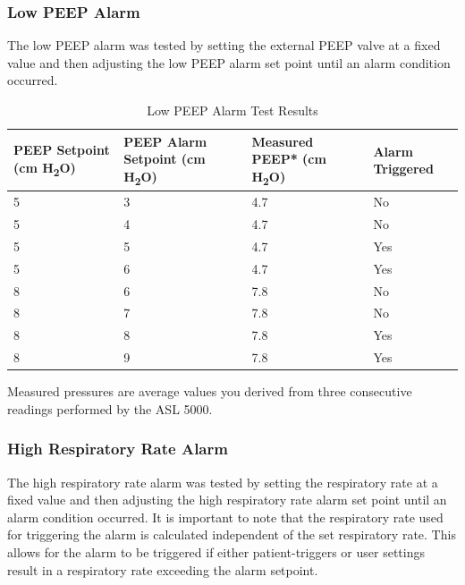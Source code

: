 \documentclass[]{article}
\begin{document}
\subsubsection{Low PEEP Alarm}

The low PEEP alarm was tested by setting the external PEEP valve at a fixed value and then adjusting the low PEEP alarm set point until an alarm condition occurred.

\begin{center}
	\begin{table}[h]
		\caption{Low PEEP Alarm Test Results}
		\label{tab:low_peep_test}
		\begin{tabular}{ |p{3.7cm}|p{3.3cm}|p{4cm}| p{2.9cm}|}
			
			\hline
			\textbf{PEEP Setpoint (cm H\textsubscript{2}O)} & \textbf{PEEP Alarm Setpoint (cm H\textsubscript{2}O)} & \textbf{Measured PEEP* (cm H\textsubscript{2}O)} & \textbf{Alarm Triggered}  \\ \hline
			5 & 3 & 4.7 & No\\ \hline
			5 & 4 & 4.7& No\\ \hline
			5 & 5 & 4.7 & Yes\\ \hline
			5 & 6 & 4.7 & Yes\\ \hline
			8 & 6 & 7.8 & No\\ \hline
			8 & 7 & 7.8 & No\\ \hline
			8 & 8 & 7.8 & Yes\\ \hline
			8 & 9 & 7.8 & Yes\\ \hline
		\end{tabular}
		\noindent *Measured pressures are average values you derived from three consecutive readings performed by the ASL 5000.
	\end{table}	
\end{center}

\subsubsection{High Respiratory Rate Alarm}
The high respiratory rate alarm was tested by setting the respiratory rate at a fixed value and then adjusting the high respiratory rate alarm set point until an alarm condition occurred.  It is important to note that the respiratory rate used for triggering the alarm is calculated independent of the set respiratory rate.  This allows for the alarm to be triggered if either patient-triggers or user settings result in a respiratory rate exceeding the alarm setpoint.
\end{document}
